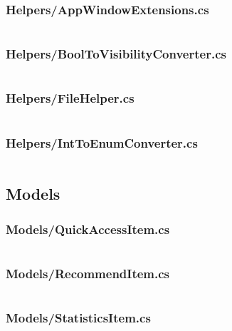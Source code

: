 \documentclass[a4paper]{report}
\begin{document}
\subsubsection{Helpers/AppWindowExtensions.cs}

\inputminted{csharp}{"../src/Algorithm Dynamics/Helpers/AppWindowExtensions.cs"}

\subsubsection{Helpers/BoolToVisibilityConverter.cs}

\inputminted{csharp}{"../src/Algorithm Dynamics/Helpers/BoolToVisibilityConverter.cs"}

\subsubsection{Helpers/FileHelper.cs}

\inputminted{csharp}{"../src/Algorithm Dynamics/Helpers/FileHelper.cs"}

\subsubsection{Helpers/IntToEnumConverter.cs}

\inputminted{csharp}{"../src/Algorithm Dynamics/Helpers/IntToEnumConverter.cs"}

\subsection{Models}

\subsubsection{Models/QuickAccessItem.cs}

\inputminted{csharp}{"../src/Algorithm Dynamics/Models/QuickAccessItem.cs"}

\subsubsection{Models/RecommendItem.cs}

\inputminted{csharp}{"../src/Algorithm Dynamics/Models/RecommendItem.cs"}

\subsubsection{Models/StatisticsItem.cs}
\end{document}
